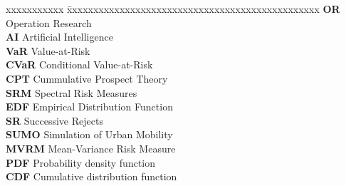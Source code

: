 \pagebreak


\begin{singlespace}
\tableofcontents
\thispagestyle{empty}

\listoftables
{}
\listoffigures
{}
\end{singlespace}


\abbreviations

\noindent 
\begin{tabbing}
xxxxxxxxxxx \= xxxxxxxxxxxxxxxxxxxxxxxxxxxxxxxxxxxxxxxxxxxxxxxx \kill
\textbf{OR} \> Operation Research\\
\textbf{AI} \> Artificial Intelligence  \\
\textbf{VaR} \> Value-at-Risk \\
\textbf{CVaR} \> Conditional Value-at-Risk \\
\textbf{CPT} \> Cummulative Prospect Theory  \\
\textbf{SRM} \> Spectral Risk Measures \\
\textbf{EDF} \> Empirical Distribution Function \\
\textbf{SR} \> Successive Rejects \\
\textbf{SUMO} \> Simulation of Urban Mobility \\
\textbf{MVRM} \> Mean-Variance Risk Measure \\
\textbf{PDF} \> Probability density function \\
\textbf{CDF} \> Cumulative distribution function \\
\textbf{} \>  \\
\textbf{} \>  \\
\textbf{} \>  \\

\end{tabbing}

